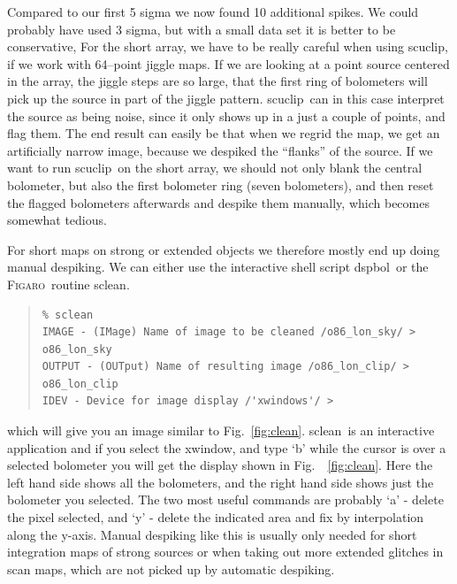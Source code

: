\documentclass[twoside,11pt]{article}
\newenvironment{myquote}{\begin{quote}\begin{small}}{\end{small}\end{quote}}
\newcommand{\Figaro}{\xref{\textsc{Figaro}}{sun86}{}}
\newcommand{\task}[1]{\textsf{#1}}
\newcommand{\dspbol}{\xref{\task{dspbol}}{sun216}{DSPBOL}}
\newcommand{\scuclip}{\xref{\task{scuclip}}{sun216}{SCUCLIP}}
\newcommand{\sclean}{\xref{\task{sclean}}{sun86}{SCLEAN}}
\newcommand{\xref}[3]{#1}
\renewcommand{\_}{\texttt{\symbol{95}}}
\begin{document}
Compared to our first 5 sigma we now found 10 additional spikes.  We
could probably have used 3 sigma, but with a small data set it is
better to be conservative, For the short array, we have to be really
careful when using \scuclip, if we work with 64--point jiggle maps.
If we are looking at a point source centered in the array, the jiggle
steps are so large, that the first ring of bolometers will pick up the
source in part of the jiggle pattern.  \scuclip\ can in this case
interpret the source as being noise, since it only shows up in a just
a couple of points, and flag them.  The end result can easily be that
when we regrid the map, we get an artificially narrow image, because
we despiked the ``flanks'' of the source.  If we want to run \scuclip\
on the short array, we should not only blank the central bolometer,
but also the first bolometer ring (seven bolometers), and then reset
the flagged bolometers afterwards and despike them manually, which
becomes somewhat tedious.


For short maps on strong or extended objects we therefore mostly end
up doing manual despiking.  We can either use the interactive shell
script \dspbol\ or the \Figaro\ routine \sclean.

\begin{myquote}
\begin{verbatim}
% sclean
IMAGE - (IMage) Name of image to be cleaned /o86_lon_sky/ >
o86_lon_sky
OUTPUT - (OUTput) Name of resulting image /o86_lon_clip/ >
o86_lon_clip
IDEV - Device for image display /'xwindows'/ >
\end{verbatim}
\end{myquote}

which will give you an image similar to Fig.\  \ref{fig:clean}.
\sclean\ is an interactive application and if you select the xwindow,
and type `b' while the cursor is over a selected bolometer you will
get the display shown in Fig.\  \ \ref{fig:clean}.  Here the left hand
side shows all the bolometers, and the right hand side shows just the
bolometer you selected.  The two most useful commands are probably `a'
- delete the pixel selected, and `y' - delete the indicated area and
fix by interpolation along the y-axis.  Manual despiking like this is
usually only needed for short integration maps of strong sources or
when taking out more extended glitches in scan maps, which are not
picked up by automatic despiking.
\end{document}
